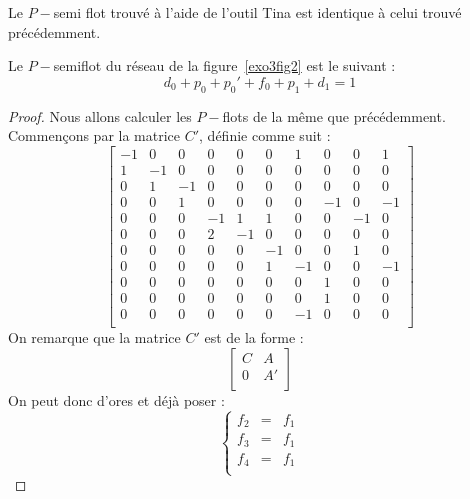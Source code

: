 \begin{rmq}
    Le $P-$semi flot trouvé à l'aide de l'outil Tina est identique à celui trouvé précédemment.
\end{rmq}



\begin{thrm}
    Le $P-$semiflot du réseau de la figure~\ref{exo3fig2} est le suivant : \[
        d_0 + p_0 + p_0' + f_0 + p_1 + d_1 = 1
    \]
\end{thrm}

\begin{proof}
    Nous allons calculer les $P-$flots de la même que précédemment. Commençons par la matrice $C'$,
    définie comme suit : \[
        \left [
        \begin{array}{cccccccccc}
            -1 & 0 & 0 & 0 & 0 & 0 & 1 & 0 & 0 & 1\\
            1 & -1 & 0 & 0 & 0 & 0 & 0 & 0 & 0 & 0\\
            0 & 1 & -1 & 0 & 0 & 0 & 0 & 0 & 0 & 0\\
            0 & 0 & 1 & 0 & 0 & 0 & 0 & -1 & 0 & -1\\
            0 & 0 & 0 & -1 & 1 & 1 & 0 & 0 & -1 & 0\\
            0 & 0 & 0 & 2 & -1 & 0 & 0 & 0 & 0 & 0\\
            0 & 0 & 0 & 0 & 0 & -1 & 0 & 0 & 1 & 0\\
            0 & 0 & 0 & 0 & 0 & 1 & -1 & 0 & 0 & -1\\
            0 & 0 & 0 & 0 & 0 & 0 & 0 & 1 & 0 & 0\\
            0 & 0 & 0 & 0 & 0 & 0 & 0 & 1 & 0 & 0\\
            0 & 0 & 0 & 0 & 0 & 0 & -1 & 0 & 0 & 0\\
        \end{array}
        \right ]
    \]
    On remarque que la matrice $C'$ est de la forme : \[
        \left [ \begin{array}{cc}
            C & A \\
            0 & A' \\
        \end{array} \right ]
    \]
    On peut donc d'ores et déjà poser : 
    \[
        \left \lbrace \begin{array}{rcl}
            f_2 & = & f_1 \\
            f_3 & = & f_1 \\
            f_4 & = & f_1 \\

\end{array}\]
\end{proof}
